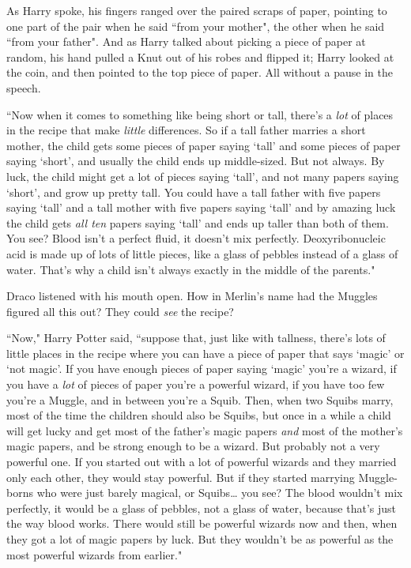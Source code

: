 As Harry spoke, his fingers ranged over the paired scraps of paper, pointing to one part of the pair when he said ``from your mother", the other when he said ``from your father". And as Harry talked about picking a piece of paper at random, his hand pulled a Knut out of his robes and flipped it; Harry looked at the coin, and then pointed to the top piece of paper. All without a pause in the speech.

``Now when it comes to something like being short or tall, there's a \emph{lot} of places in the recipe that make \emph{little} differences. So if a tall father marries a short mother, the child gets some pieces of paper saying `tall' and some pieces of paper saying `short', and usually the child ends up middle-sized. But not always. By luck, the child might get a lot of pieces saying `tall', and not many papers saying `short', and grow up pretty tall. You could have a tall father with five papers saying `tall' and a tall mother with five papers saying `tall' and by amazing luck the child gets \emph{all ten} papers saying `tall' and ends up taller than both of them. You see? Blood isn't a perfect fluid, it doesn't mix perfectly. Deoxyribonucleic acid is made up of lots of little pieces, like a glass of pebbles instead of a glass of water. That's why a child isn't always exactly in the middle of the parents."

Draco listened with his mouth open. How in Merlin's name had the Muggles figured all this out? They could \emph{see} the recipe?

``Now," Harry Potter said, ``suppose that, just like with tallness, there's lots of little places in the recipe where you can have a piece of paper that says `magic' or `not magic'. If you have enough pieces of paper saying `magic' you're a wizard, if you have a \emph{lot} of pieces of paper you're a powerful wizard, if you have too few you're a Muggle, and in between you're a Squib. Then, when two Squibs marry, most of the time the children should also be Squibs, but once in a while a child will get lucky and get most of the father's magic papers \emph{and} most of the mother's magic papers, and be strong enough to be a wizard. But probably not a very powerful one. If you started out with a lot of powerful wizards and they married only each other, they would stay powerful. But if they started marrying Muggle-borns who were just barely magical, or Squibs{\ldots} you see? The blood wouldn't mix perfectly, it would be a glass of pebbles, not a glass of water, because that's just the way blood works. There would still be powerful wizards now and then, when they got a lot of magic papers by luck. But they wouldn't be as powerful as the most powerful wizards from earlier."

